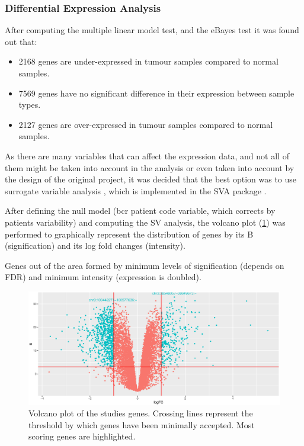 \documentclass[9pt,twocolumn,twoside]{gsajnl}
\begin{document}
\subsubsection*{Differential Expression Analysis}

After computing the multiple linear model test, and the eBayes test \cite{limma} 	it was found out that:

\begin{itemize}
\item 2168 genes are under-expressed in tumour samples compared to normal samples.
\item 7569 genes have no significant difference in their expression between sample types.
\item 2127 genes are over-expressed in tumour samples compared to normal samples.
\end{itemize}

As there are many variables that can affect the expression data, and not all of them might be taken into account in the analysis or even taken into account by the design of the original project, it was decided that the best option was to use surrogate variable analysis \cite{leek2007capturing}, which is implemented in the SVA package \cite{SVA}.


After defining the null model (bcr patient code variable, which corrects by patients variability) and computing the SV analysis, the volcano plot (\ref{fig:volcano}) was performed to graphically represent the distribution of genes by its B (signification) and its log fold changes (intensity).

Genes out of the area formed by minimum levels of signification (depends on FDR) and minimum intensity (expression is doubled).


\begin{figure}[htbp]
\centering
\includegraphics[width=\linewidth]{Volcano.eps}
\caption{Volcano plot of the studies genes. Crossing lines represent the threshold by which genes have been minimally accepted. Most scoring genes are highlighted.
}
\label{fig:volcano}
\end{figure}
\end{document}
